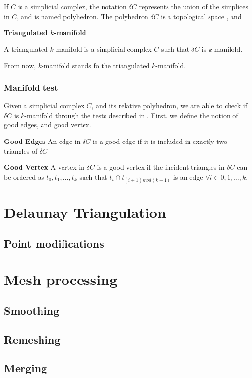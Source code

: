 If $C$ is a simplicial complex, the notation $\delta C$ represents the union of the simplices in $C$, and is named polyhedron. The polyhedron $\delta C$ is a topological space , and 

\begin{mydef}
\textbf{Triangulated $k$-manifold}

A triangulated $k$-manifold is a simplicial complex $C$ such that $\delta C$ is $k$-manifold.
\end{mydef}

From now, $k$-manifold stands fo the triangulated $k$-manifold.

\subsubsection{Manifold test}
Given a simplicial complex $C$, and its relative polyhedron, we are able to check if $\delta C$ is $k$-manifold through the tests described in \cite{lhuillier20152}.
First, we define the notion of good edges, and good vertex.


\begin{mydef}
\textbf{Good Edges}
An edge in $\delta C$ is a good edge if it is included in exactly two triangles of $\delta C$
\end{mydef}

\begin{mydef}
\textbf{Good Vertex}
A vertex in $\delta C$  is a good vertex if the incident triangles in $\delta C$  can be ordered as
$t_0 , t_1, \dots, t_k$ such that $t_i \cap t_{(i+1) mod (k+1)}$ is an edge $\forall i \in {0, 1, \dots, k}$.
\end{mydef}




% 












\section{Delaunay Triangulation}
\subsection{Point modifications}
\section{Mesh processing}
\subsection{Smoothing}
\subsection{Remeshing}
\subsection{Merging}